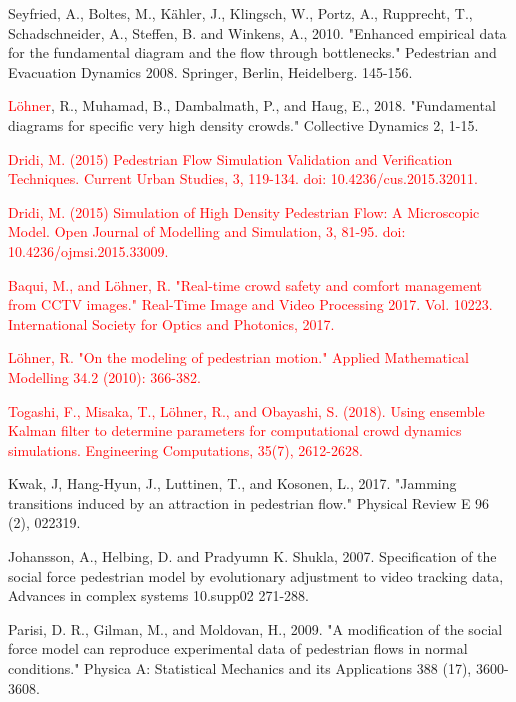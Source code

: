 \documentclass[preprint,12pt]{elsarticle}
\begin{document}
\begin{thebibliography}{10}
Seyfried, A., Boltes, M., K\"ahler, J., Klingsch, W., Portz, A., Rupprecht, 
T., Schadschneider, A., Steffen, B. and Winkens, A., 2010. "Enhanced empirical 
data for the fundamental diagram and the flow through bottlenecks." Pedestrian 
and Evacuation Dynamics 2008. Springer, Berlin, Heidelberg. 145-156.
{}

\textcolor{red}{L\"ohner}, R., Muhamad, B., Dambalmath, P., and Haug, E., 2018. 
"Fundamental diagrams for specific very high density crowds." Collective 
Dynamics 2, 1-15.
{}

\textcolor{red}{Dridi, M. (2015) Pedestrian Flow Simulation Validation and
Verification Techniques. Current Urban Studies, 3, 119-134.
doi: 10.4236/cus.2015.32011.}

\textcolor{red}{Dridi, M. (2015) Simulation of High Density Pedestrian Flow:
A Microscopic Model. Open Journal of Modelling and Simulation,
3, 81-95. doi: 10.4236/ojmsi.2015.33009.}

\textcolor{red}{Baqui, M., and L\"ohner, R. "Real-time crowd safety
and comfort management from CCTV images." Real-Time Image and Video Processing 2017.
Vol. 10223. International Society for Optics and Photonics, 2017.}

\textcolor{red}{L\"ohner, R. "On the modeling of pedestrian motion." 
Applied Mathematical Modelling 34.2 (2010): 366-382.}

\textcolor{red}{Togashi, F., Misaka, T., L\"ohner, R., and Obayashi, S. (2018). 
Using ensemble Kalman filter to determine parameters for computational crowd dynamics simulations. 
Engineering Computations, 35(7), 2612-2628.}

Kwak, J, Hang-Hyun, J., Luttinen, T., and Kosonen, L., 2017. "Jamming 
transitions induced by an attraction in pedestrian flow." Physical Review E 96 
(2), 022319.
{}

Johansson, A., Helbing, D. and Pradyumn K. Shukla, 2007. Specification of 
the social force pedestrian model by evolutionary adjustment to video tracking 
data, Advances in complex systems 10.supp02 271-288. 
{}

Parisi, D. R., Gilman, M., and Moldovan, H., 2009. "A modification of the 
social force model can reproduce experimental data of pedestrian flows in 
normal 
conditions." Physica A: Statistical Mechanics and its Applications 388 
(17), 3600-3608.
{}


\end{thebibliography}
\end{document}
